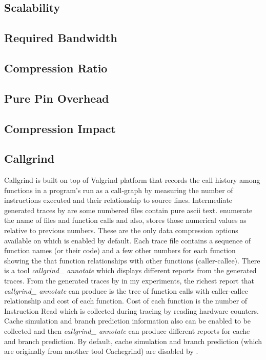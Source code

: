\subsection{Scalability}

\subsection{Required Bandwidth}

\subsection{Compression Ratio}

\subsection{Pure Pin Overhead}

\subsection{Compression Impact}

\subsection{Callgrind}
Callgrind is built on top of Valgrind platform that records the call history among functions in a program's run as a call-graph by measuring the number of instructions executed and their relationship to source lines. 
Intermediate generated traces by \callgrind are some numbered files contain pure ascii text. \callgrind enumerate the name of files and function calls and also, stores those numerical values as relative to previous numbers. These are the only data compression options available on \callgrind which is enabled by default. Each \callgrind trace file contains a sequence of function names (or their code) and a few other numbers for each function showing the that function relationships with other functions (caller-callee). There is a tool \textit{callgrind\_ annotate} which displays different reports from the generated traces. From the generated traces by \callgrind in my experiments, the richest report that \textit{callgrind\_ annotate} can produce is the tree of function calls with caller-callee relationship and cost of each function. Cost of each function is the number of Instruction Read which is collected during tracing by reading hardware counters. Cache simulation and branch prediction information also can be enabled to be collected and then \textit{callgrind\_ annotate} can produce different reports for cache and branch prediction. By default, cache simulation and branch prediction (which are originally from another tool Cachegrind) are disabled by \callgrind.


